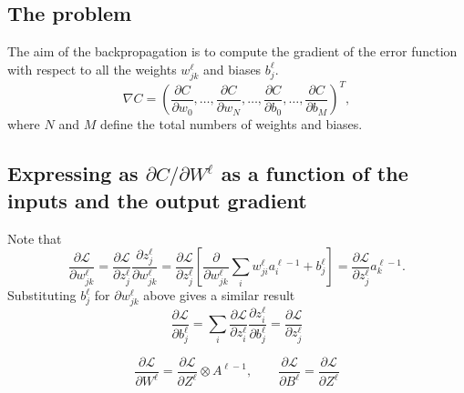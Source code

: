 \documentclass[a4paper,10pt]{article}
\def\Loss{\mathcal{L}}
\begin{document}
\subsection{The problem}

The aim of the backpropagation is to compute the gradient of the error function
with respect to all the weights $w_{jk}^\ell$ and biases $b_j^\ell$.
\[
    \nabla C =
    \left(\frac{\partial C}{\partial w_0}, \ldots,\frac{\partial C}{\partial w_N}, \ldots,\frac{\partial C}{\partial b_0}, \ldots,\frac{\partial C}{\partial b_M} \right)^T,
\]
where $N$ and $M$ define the total numbers of weights and biases.

\subsection{Expressing as $\partial C / \partial W^\ell$ as a function of the inputs and the output gradient}


Note that
\[
    \frac{\partial \Loss}{\partial w_{jk}^\ell} 
    = \frac{\partial \Loss}{\partial z_j^\ell} \frac{\partial z_j^\ell}{\partial w_{jk}^\ell} 
    = \frac{\partial \Loss}{\partial z_j^\ell} \left[ \frac{\partial}{\partial w_{jk}^\ell} \sum_i w_{ji}^\ell a_{i}^{\ell-1} + b_j^\ell \right] 
    = \frac{\partial \Loss}{\partial z_j^\ell} a_{k}^{\ell-1}.
\]
Substituting $b_j^\ell$ for $\partial w_{jk}^\ell$ above gives a similar result
\[
    \frac{\partial \Loss}{\partial b_{j}^\ell} 
    = \sum_i \frac{\partial \Loss}{\partial z_i^\ell} \frac{\partial z_i^\ell}{\partial b_j^\ell} = 
    \frac{\partial \Loss}{\partial z_{j}^\ell} 
\]

\begin{equation}
    \boxed{
        \frac{\partial \Loss}{\partial W^\ell} = \frac{\partial\Loss}{\partial Z^\ell} \otimes A^{\ell -1}, \qquad
        \frac{\partial \Loss}{\partial B^\ell} = \frac{\partial\Loss}{\partial Z^\ell}
    }
\end{equation}
    


\end{document}
